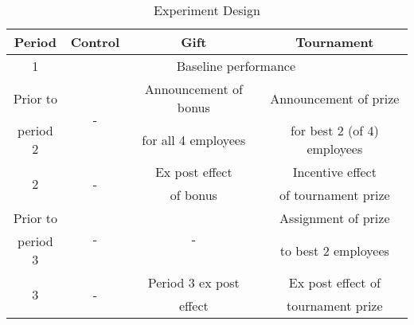 {\begin{table}[H]\caption{Experiment Design}
\begin{center}%
{\small\renewcommand{\arraystretch}{1}
\begin{tabular}{|c|c|c|c|} \hline\hline
	\bf Period  		& \bf Control 	& \bf Gift 	& \bf Tournament \\
	\hline
	\multirow{2}{*}{1} 	& \multicolumn{3}{c|}{\multirow{2}{*}{Baseline performance}} \\
						& \multicolumn{3}{c|}{} \\
	\hline
	Prior to 			& \multirow{2}{*}{-}& Announcement of bonus & Announcement of prize \\
	period 2			&					& for all 4 employees 	& for best 2 (of 4) employees \\
	\hline
	\multirow{2}{*}{2} 	& \multirow{2}{*}{-}& Ex post effect  	& Incentive effect \\
						&					& of bonus 			& of tournament prize \\
	\hline
	Prior to 			& \multirow{2}{*}{-}& \multirow{2}{*}{-} & Assignment of prize \\
	period 3			&					& 					 & to best 2 employees \\
	\hline
	\multirow{2}{*}{3} 	& \multirow{2}{*}{-}& Period 3 ex post  	& Ex post effect of \\
						&					& effect				& tournament prize \\
	\hline \hline
\end{tabular}}
\label{tab:payoff_overview}
\begin{comment}
\begin{minipage}{0.98\linewidth}
	\footnotesize
	\vspace{5mm}
	{\it Note:} This table describes the data we observe each period and the treatments given between periods. 
\end{minipage}
\end{comment}
\end{center}
\end{table}}